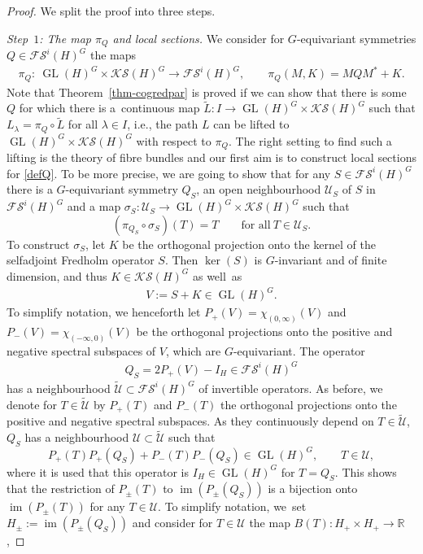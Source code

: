 \documentclass[pdftex]{sigma}
\numberwithin{equation}{section}
\theoremstyle{definition}
\DeclareMathOperator{\im}{im}
\DeclareMathOperator{\GL}{GL}
\begin{document}
\begin{proof}
We split the proof into three steps.

{\it Step~$1$: The map $\pi_Q$ and local sections.}
We consider for $G$-equivariant symmetries $Q\in\mathcal{FS}^i(H)^G$ the maps
\begin{align}\label{defQ}
\pi_Q \colon \ \GL(H)^G\times\mathcal{KS}(H)^G\rightarrow\mathcal{FS}^i(H)^G,\qquad \pi_Q(M,K)=MQM^\ast+K.
\end{align}
Note that Theorem~\ref{thm-cogredpar} is proved if we can show that there is some $Q$ for which there is a~continuous map $\tilde{L} \colon I\rightarrow \GL(H)^G\times\mathcal{KS}(H)^G$ such that $L_\lambda=\pi_Q\circ\tilde{L}$ for all $\lambda\in I$, i.e., the path $L$ can be lifted to $\GL(H)^G\times\mathcal{KS}(H)^G$ with respect to $\pi_Q$. The right setting to find such a lifting is the theory of fibre bundles and our first aim is to construct local sections for \eqref{defQ}. To be more precise, we are going to show that for any $S\in\mathcal{FS}^i(H)^G$ there is a $G$-equivariant symmetry $Q_S$, an open neighbourhood $\mathcal{U}_S$ of $S$ in $\mathcal{FS}^i(H)^G$ and a map $\sigma_S \colon \mathcal{U}_S\rightarrow\GL(H)^G\times\mathcal{KS}(H)^G$ such that
\[(\pi_{Q_S}\circ\sigma_S)(T)=T\qquad\text{for all} \ T\in\mathcal{U}_S.\]
To construct $\sigma_S$, let $K$ be the orthogonal projection onto the kernel of the selfadjoint Fredholm operator $S$. Then $\ker(S)$ is $G$-invariant and of finite dimension, and thus $K\in\mathcal{KS}(H)^G$ as well~as
\begin{align}\label{V}
V:=S+K\in \GL(H)^G.
\end{align}
To simplify notation, we henceforth let $P_+(V)=\chi_{(0,\infty)}(V)$ and $P_-(V)=\chi_{(-\infty,0)}(V)$ be the orthogonal projections onto the positive and negative spectral subspaces of $V$, which are $G$\nobreakdash-equiv\-ari\-ant. The operator
\begin{align}\label{QS}
Q_S=2P_+(V)-I_H\in\mathcal{FS}^i(H)^G
\end{align}
has a neighbourhood $\tilde{\mathcal{U}}\subset\mathcal{FS}^i(H)^G$ of invertible operators. As before, we denote for $T\in\tilde{\mathcal{U}}$ by $P_+(T)$ and $P_-(T)$ the orthogonal projections onto the positive and negative spectral subspaces. As they continuously depend on $T\in\tilde{\mathcal{U}}$, $Q_S$ has a neighbourhood $\mathcal{U}\subset\tilde{\mathcal{U}}$ such that
\[P_+(T) P_+(Q_S)+P_-(T) P_-(Q_S)\in\GL(H)^G,\qquad T\in \mathcal{U},\]
where it is used that this operator is $I_H\in\GL(H)^G$ for $T=Q_S$. This shows that the restriction of $P_\pm(T)$ to $\im(P_\pm(Q_S))$ is a bijection onto $\im(P_\pm(T))$ for any $T\in\mathcal{U}$. To simplify notation, we~set $H_\pm:=\im(P_\pm(Q_S))$ and consider for $T\in\mathcal{U}$ the map $B(T) \colon H_+\times H_+\rightarrow\mathbb{R}$,

\end{proof}
\end{document}
